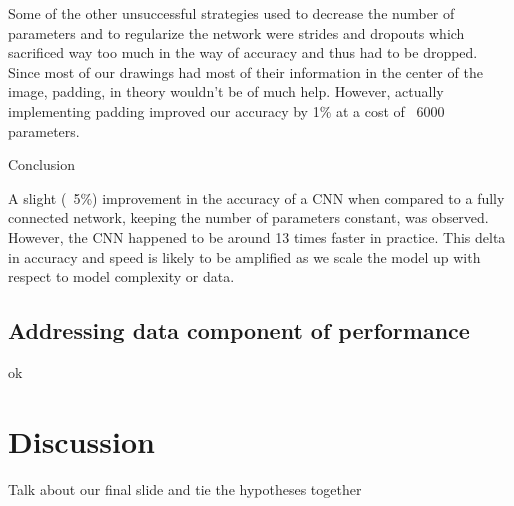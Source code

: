 \documentclass[12pt]{article}
\begin{document}
Some of the other unsuccessful strategies used to decrease the number of
parameters and to regularize the network were strides and dropouts which
sacrificed way too much in the way of accuracy and thus had to be dropped.
Since most of our drawings had most of their information in the center of the
image, padding, in theory wouldn’t be of much help. However, actually
implementing padding improved our accuracy by 1\% at a cost of ~6000
parameters.

Conclusion

A slight (~5\%) improvement in the accuracy of a CNN when compared to a fully connected network, keeping the number of parameters constant, was observed. However, the CNN happened to be around 13 times faster in practice. This delta in accuracy and speed is likely to be amplified as we scale the model up with respect to model complexity or data.

\subsection{Addressing data component of performance}

ok

\section{Discussion}

Talk about our final slide and tie the hypotheses together





\end{document}
